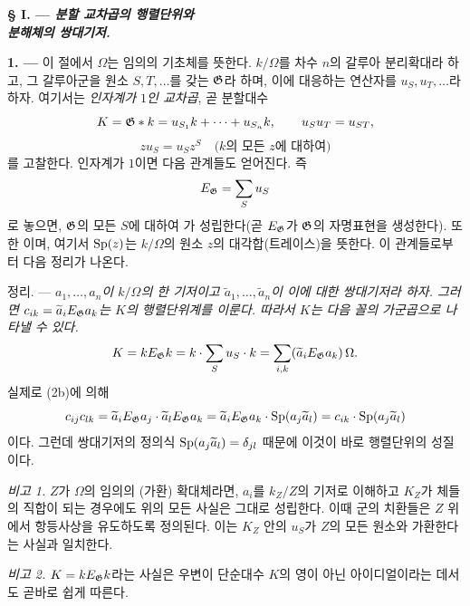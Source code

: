 \begin{center}
\textbf{§ I. --- \emph{분할 교차곱의 행렬단위와\\
분해체의 쌍대기저.}}
\end{center}

\noindent\textbf{1. ---} 이 절에서 $\Omega$는 임의의 기초체를 뜻한다. $k/\Omega$를 차수 $n$의 갈루아 분리확대라 하고, 그 갈루아군을 원소 $S,T,\ldots$를 갖는 $\mathfrak G$라 하며, 이에 대응하는 연산자를 $u_S,u_T,\ldots$라 하자. 여기서는 \emph{인자계가 $1$인 교차곱}, 곧 분할대수
\[
K=\mathfrak G\ast k=u_{S_1}k+\cdots+u_{S_n}k,\qquad u_Su_T=u_{ST},
\]
\[
zu_S=u_Sz^S\quad\text{($k$의 모든 $z$에 대하여)}
\]
를 고찰한다. 인자계가 $1$이면 다음 관계들도 얻어진다. 즉
\[
E_\mathfrak G=\sum_Su_S
\]
로 놓으면, $\mathfrak G$의 모든 $S$에 대하여
가 성립한다(곧 $E_\mathfrak G$가 $\mathfrak G$의 자명표현을 생성한다). 또한
이며, 여기서 $\operatorname{Sp}(z)$는 $k/\Omega$의 원소 $z$의 대각합(트레이스)을 뜻한다. 이 관계들로부터 다음 정리가 나온다.

\medskip
\noindent\textsc{정리. ---} \emph{$a_1,\ldots,a_n$이 $k/\Omega$의 한 기저이고 $\widetilde a_1,\ldots,\widetilde a_n$이 이에 대한 쌍대기저라 하자. 그러면 $c_{ik}=\widetilde a_iE_\mathfrak G a_k$는 $K$의 행렬단위계를 이룬다. 따라서 $K$는 다음 꼴의 가군곱으로 나타낼 수 있다.}
\[
K=kE_\mathfrak G k=k\cdot\sum_Su_S\cdot k
 =\sum_{i,k}(\widetilde a_iE_\mathfrak G a_k)\,\Omega.
\]
실제로 (2b)에 의해
\[
c_{ij}c_{lk}
 =\widetilde a_iE_\mathfrak G a_j\cdot\widetilde a_lE_\mathfrak G a_k
 =\widetilde a_iE_\mathfrak G a_k\cdot\operatorname{Sp}(a_j\widetilde a_l)
 =c_{ik}\cdot\operatorname{Sp}(a_j\widetilde a_l)
\]
이다. 그런데 쌍대기저의 정의식 $\operatorname{Sp}(a_j\widetilde a_l)=\delta_{jl}$ 때문에 이것이 바로 행렬단위의 성질이다.

\emph{비고 1.} $Z$가 $\Omega$의 임의의 (가환) 확대체라면, $a_i$를 $k_Z/Z$의 기저로 이해하고 $K_Z$가 체들의 직합이 되는 경우에도 위의 모든 사실은 그대로 성립한다. 이때 군의 치환들은 $Z$ 위에서 항등사상을 유도하도록 정의된다. 이는 $K_Z$ 안의 $u_S$가 $Z$의 모든 원소와 가환한다는 사실과 일치한다.

\emph{비고 2.} $K=kE_\mathfrak G k$라는 사실은 우변이 단순대수 $K$의 영이 아닌 아이디얼이라는 데서도 곧바로 쉽게 따른다.

